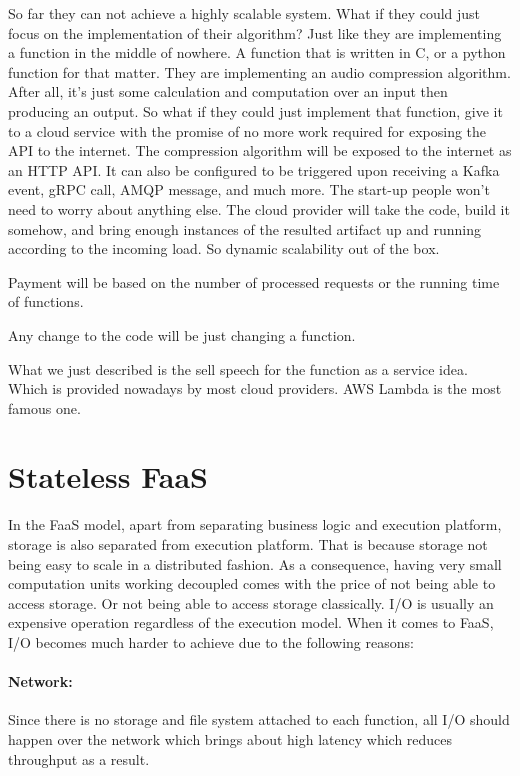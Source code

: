 \documentclass[a4]{report}
\begin{document}
    So far they can not achieve a highly scalable system.
    What if they could just focus on the implementation of their algorithm?
    Just like they are implementing a function in the middle of nowhere.
    A function that is written in C, or a python function for that matter.
    They are implementing an audio compression algorithm.
    After all, it's just some calculation and computation over an input then producing an output.
    So what if they could just implement that function, give it to a cloud service with the promise of no more work required for exposing the API to the internet.
    The compression algorithm will be exposed to the internet as an HTTP API.
    It can also be configured to be triggered upon receiving a Kafka event, gRPC call, AMQP message, and much more.
    The start-up people won't need to worry about anything else.
    The cloud provider will take the code, build it somehow, and bring enough instances of the resulted artifact up and running according to the incoming load.
    So dynamic scalability out of the box.

    Payment will be based on the number of processed requests or the running time of functions.

    Any change to the code will be just changing a function.

    What we just described is the sell speech for the function as a service idea.
    Which is provided nowadays by most cloud providers.
    AWS Lambda is the most famous one.


    \section{Stateless FaaS}
    In the FaaS model, apart from separating business logic and execution platform, storage is also separated from
    execution platform.
    That is because storage not being easy to scale in a distributed fashion.
    As a consequence, having very small computation units working decoupled comes with the price of not being able to access storage.
    Or not being able to access storage classically.
    I/O is usually an expensive operation regardless of the execution model.
    When it comes to FaaS, I/O becomes much harder to achieve due to the following reasons:

    \paragraph{Network:} Since there is no storage and file system attached to each function, all I/O should happen over the network which brings about high latency which reduces throughput as a result.
\end{document}

